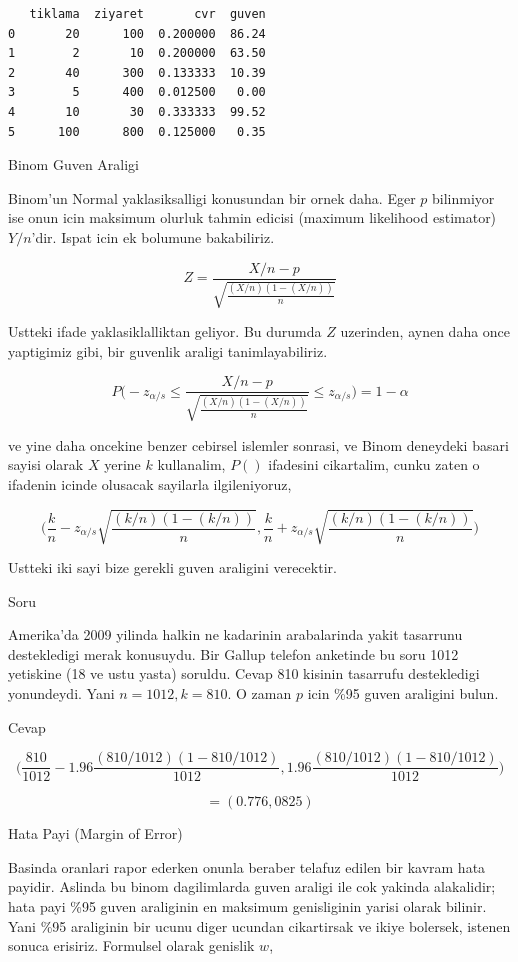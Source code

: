 \documentclass[12pt,fleqn]{article}\usepackage{../common}
\begin{document}
\begin{verbatim}
   tiklama  ziyaret       cvr  guven
0       20      100  0.200000  86.24
1        2       10  0.200000  63.50
2       40      300  0.133333  10.39
3        5      400  0.012500   0.00
4       10       30  0.333333  99.52
5      100      800  0.125000   0.35
\end{verbatim}

Binom Guven Araligi

Binom'un Normal yaklasiksalligi konusundan bir ornek daha. Eger $p$
bilinmiyor ise onun icin maksimum olurluk tahmin edicisi (maximum
likelihood estimator) $Y/n$'dir. Ispat icin ek bolumune bakabiliriz.

$$Z  = \frac{X/n - p}{\sqrt{\frac{(X/n)(1-(X/n))}{n}}}$$

Ustteki ifade yaklasiklalliktan geliyor. Bu durumda $Z$ uzerinden, aynen
daha once yaptigimiz gibi, bir guvenlik araligi tanimlayabiliriz. 

$$ 
P \bigg( 
-z_{\alpha/s} \le
\frac{X/n - p}{\sqrt{\frac{(X/n)(1-(X/n))}{n}}} \le 
z_{\alpha/s}
\bigg) =
1-\alpha
$$

ve yine daha oncekine benzer cebirsel islemler sonrasi, ve Binom deneydeki
basari sayisi olarak $X$ yerine $k$ kullanalim, $P()$ ifadesini cikartalim,
cunku zaten o ifadenin icinde olusacak sayilarla ilgileniyoruz,

$$ 
\bigg( 
\frac{k}{n}-
z_{\alpha/s}\sqrt{\frac{(k/n)(1-(k/n))}{n}}
,
\frac{k}{n} +
z_{\alpha/s} \sqrt{\frac{(k/n)(1-(k/n))}{n}}
\bigg)
$$

Ustteki iki sayi bize gerekli guven araligini verecektir. 

Soru 

Amerika'da 2009 yilinda halkin ne kadarinin arabalarinda yakit tasarrunu
destekledigi merak konusuydu. Bir Gallup telefon anketinde bu soru 1012
yetiskine (18 ve ustu yasta) soruldu. Cevap 810 kisinin tasarrufu
destekledigi yonundeydi. Yani $n=1012,k=810$. O zaman $p$ icin \%95 guven
araligini bulun.

Cevap 

$$ \bigg(
\frac{810}{1012}-1.96 \frac{(810/1012)(1-810/1012)}{1012} ,
1.96 \frac{(810/1012)(1-810/1012)}{1012}
\bigg)
$$

$$ = (0.776,0825) $$


Hata Payi (Margin of Error)

Basinda oranlari rapor ederken onunla beraber telafuz edilen bir kavram
hata payidir. Aslinda bu binom dagilimlarda guven araligi ile cok yakinda
alakalidir;  hata payi \%95 guven araliginin en maksimum genisliginin yarisi
olarak bilinir. Yani \%95 araliginin bir ucunu diger ucundan cikartirsak ve
ikiye bolersek, istenen sonuca erisiriz. Formulsel olarak genislik $w$,
\end{document}
